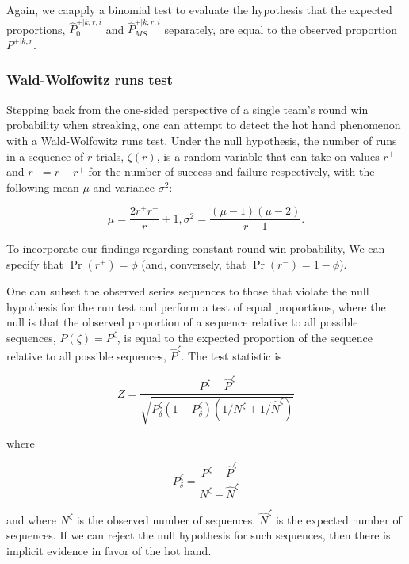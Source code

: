 \documentclass{article}
\begin{document}
Again, we caapply a binomial test to evaluate the hypothesis that the
expected proportions, \(\hat{P}^{+|k,r,i}_0\) and
\(\hat{P}^{+|k,r,i}_{MS}\) separately, are equal to the observed
proportion \(P^{+|k,r}\).

\hypertarget{wald-wolfowitz-runs-test}{%
\subsubsection{Wald-Wolfowitz runs
test}\label{wald-wolfowitz-runs-test}}

Stepping back from the one-sided perspective of a single team's round
win probability when streaking, one can attempt to detect the hot hand
phenomenon with a Wald-Wolfowitz runs test. Under the null hypothesis,
the number of runs in a sequence of \(r\) trials, \(\zeta(r)\), is a
random variable that can take on values \(r^+\) and \(r^- = r - r^+\)
for the number of success and failure respectively, with the following
mean \(\mu\) and variance \(\sigma^2\):

\begin{equation}\label{eq:ww}
\mu = \frac{2r^{+}r^{-}}{r} + 1, \sigma^2 = \frac{(\mu-1)(\mu-2)}{r-1}.
\end{equation}

To incorporate our findings regarding constant round win probability, We
can specify that \(\Pr(r^+) = \phi\) (and, conversely, that
\(\Pr(r^-) = 1 - \phi\)).

One can subset the observed series sequences to those that violate the
null hypothesis for the run test and perform a test of equal
proportions, where the null is that the observed proportion of a
sequence relative to all possible sequences, \(P(\zeta) = P^\zeta\), is
equal to the expected proportion of the sequence relative to all
possible sequences, \(\hat{P}^\zeta\). The test statistic is

\begin{equation}\label{eq:prop}
Z = \frac{P^\zeta - \hat{P}^\zeta}{\sqrt{P^\zeta_{\delta} (1 - P^\zeta_{\delta}) (1 / N^\zeta + 1 / \hat{N}^\zeta)  } }
\end{equation}

where

\[
P^\zeta_{\delta} = \frac{P^\zeta - \hat{P}^\zeta}{N^\zeta - \hat{N}^\zeta}
\]

and where \(N^\zeta\) is the observed number of sequences,
\(\hat{N}^\zeta\) is the expected number of sequences. If we can reject
the null hypothesis for such sequences, then there is implicit evidence
in favor of the hot hand.
\end{document}
